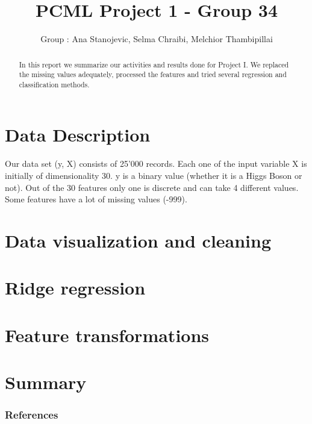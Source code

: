 \documentclass[11pt]{article}
\title{\bf PCML Project 1 - Group 34}
\author{Group \textnumero{34}: Ana Stanojevic, Selma Chraibi, Melchior Thambipillai}
\begin{document}
\maketitle

\begin{abstract}
In this report we summarize our activities and results done for Project I. We replaced the missing values adequately, processed the features and tried several regression and classification methods. 
\end{abstract}

\section{Data Description}
Our data set (y, X) consists of 25'000 records. Each one of the input variable X is initially of dimensionality 30. y is a binary value (whether it is a Higgs Boson or not). Out of the 30 features only one is discrete and can take 4 different values. Some features have a lot of missing values (-999).

\section{Data visualization and cleaning}

\section{Ridge regression}

\section{Feature transformations}


\section{Summary}


\subsubsection*{References}
\end{document}
